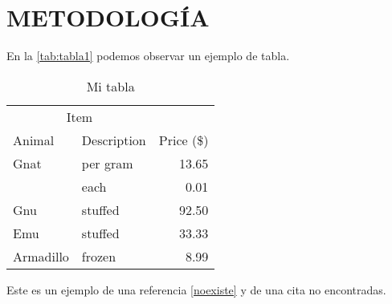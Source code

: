 \chapter{METODOLOGÍA}

\lipsum[1-1] \parencite{latex2e}

En la \autoref{tab:tabla1} podemos observar un ejemplo de tabla.

\begin{table}[H]
	\centering
	\caption{Mi tabla}\label{tab:tabla1}
	\begin{tabular}{@{}llr@{}}
		\toprule
		\multicolumn{2}{c}{Item} &                          \\ \cmidrule(r){1-2}
		Animal                   & Description & Price (\$) \\ \midrule
		Gnat                     & per gram    & 13.65      \\
		                         & each        & 0.01       \\
		Gnu                      & stuffed     & 92.50      \\
		Emu                      & stuffed     & 33.33      \\
		Armadillo                & frozen      & 8.99       \\ \bottomrule
	\end{tabular}
\end{table}

Este es un ejemplo de una referencia \autoref{noexiste} y de una cita\autocite{noexiste} no encontradas.